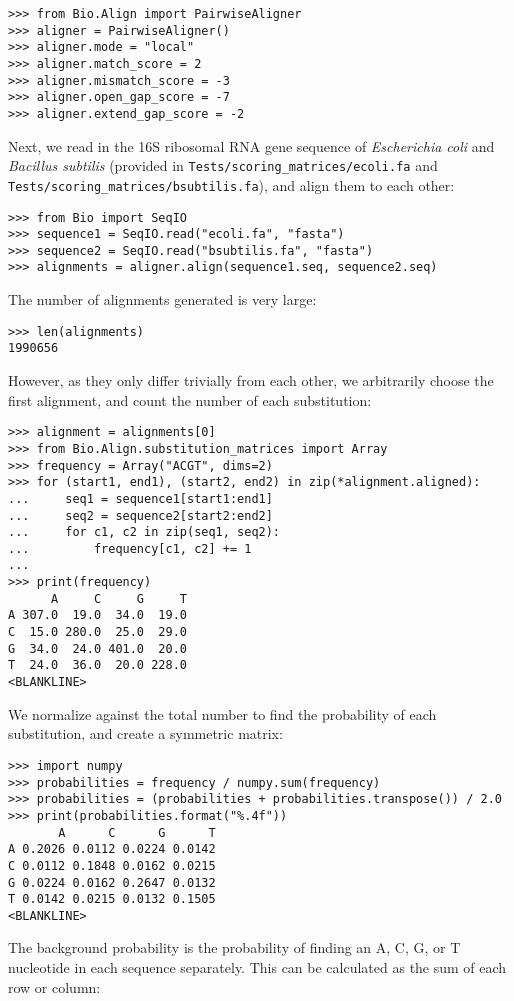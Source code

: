\begin{verbatim}
>>> from Bio.Align import PairwiseAligner
>>> aligner = PairwiseAligner()
>>> aligner.mode = "local"
>>> aligner.match_score = 2
>>> aligner.mismatch_score = -3
>>> aligner.open_gap_score = -7
>>> aligner.extend_gap_score = -2
\end{verbatim}
Next, we read in the 16S ribosomal RNA gene sequence of {\it Escherichia coli} and {\it Bacillus subtilis} (provided in \verb+Tests/scoring_matrices/ecoli.fa+ and \verb+Tests/scoring_matrices/bsubtilis.fa+), and align them to each other:

\begin{verbatim}
>>> from Bio import SeqIO
>>> sequence1 = SeqIO.read("ecoli.fa", "fasta")
>>> sequence2 = SeqIO.read("bsubtilis.fa", "fasta")
>>> alignments = aligner.align(sequence1.seq, sequence2.seq)
\end{verbatim}
The number of alignments generated is very large:

\begin{verbatim}
>>> len(alignments)
1990656
\end{verbatim}
However, as they only differ trivially from each other, we arbitrarily choose the first alignment, and count the number of each substitution:

\begin{verbatim}
>>> alignment = alignments[0]
>>> from Bio.Align.substitution_matrices import Array
>>> frequency = Array("ACGT", dims=2)
>>> for (start1, end1), (start2, end2) in zip(*alignment.aligned):
...     seq1 = sequence1[start1:end1]
...     seq2 = sequence2[start2:end2]
...     for c1, c2 in zip(seq1, seq2):
...         frequency[c1, c2] += 1
...
>>> print(frequency)
      A     C     G     T
A 307.0  19.0  34.0  19.0
C  15.0 280.0  25.0  29.0
G  34.0  24.0 401.0  20.0
T  24.0  36.0  20.0 228.0
<BLANKLINE>
\end{verbatim}
We normalize against the total number to find the probability of each substitution, and create a symmetric matrix:

\begin{verbatim}
>>> import numpy
>>> probabilities = frequency / numpy.sum(frequency)
>>> probabilities = (probabilities + probabilities.transpose()) / 2.0
>>> print(probabilities.format("%.4f"))
       A      C      G      T
A 0.2026 0.0112 0.0224 0.0142
C 0.0112 0.1848 0.0162 0.0215
G 0.0224 0.0162 0.2647 0.0132
T 0.0142 0.0215 0.0132 0.1505
<BLANKLINE>
\end{verbatim}
The background probability is the probability of finding an A, C, G, or T nucleotide in each sequence separately. This can be calculated as the sum of each row or column:

